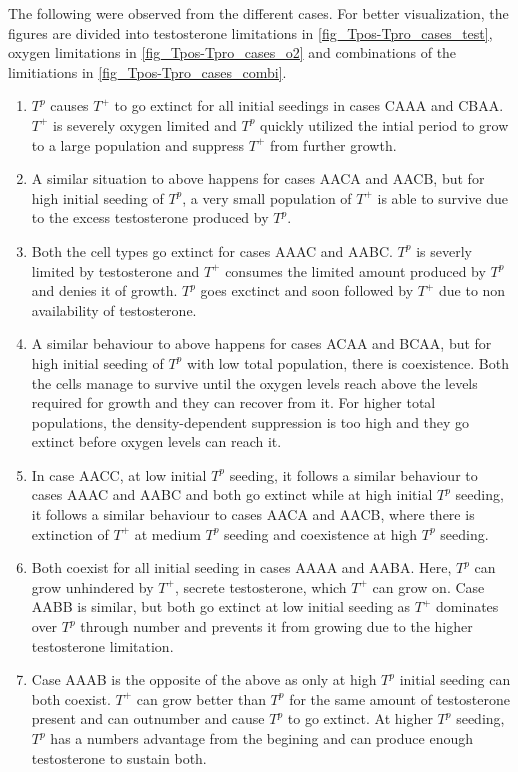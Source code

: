 The following were observed from the different cases. For better visualization, the figures are divided into testosterone limitations in \autoref{fig_Tpos-Tpro_cases_test}, oxygen limitations in \autoref{fig_Tpos-Tpro_cases_o2} and combinations of the limitiations in \autoref{fig_Tpos-Tpro_cases_combi}.
\begin{enumerate}
  \item $T^p$ causes $T^+$ to go extinct for all initial seedings in cases CAAA and CBAA. $T^+$ is severely oxygen limited and $T^p$ quickly utilized the intial period to grow to a large population and suppress $T^+$ from further growth.
  \item A similar situation to above happens for cases AACA and AACB, but for high initial seeding of $T^p$, a very small population of $T^+$ is able to survive due to the excess testosterone produced by $T^p$.
  \item Both the cell types go extinct for cases AAAC and AABC. $T^p$ is severly limited by testosterone and $T^+$ consumes the limited amount produced by $T^p$ and denies it of growth. $T^p$ goes exctinct and soon followed by $T^+$ due to non availability of testosterone.
  \item A similar behaviour to above happens for cases ACAA and BCAA, but for high initial seeding of $T^p$ with low total population, there is coexistence. Both the cells manage to survive until the oxygen levels reach above the levels required for growth and they can recover from it. For higher total populations, the density-dependent suppression is too high and they go extinct before oxygen levels can reach it.
  \item In case AACC, at low initial $T^p$ seeding, it follows a similar behaviour to cases AAAC and AABC and both go extinct while at high initial $T^p$ seeding, it follows a similar behaviour to cases AACA and AACB, where there is extinction of $T^+$ at medium $T^p$ seeding and coexistence at high $T^p$ seeding.
  \item Both coexist for all initial seeding in cases AAAA and AABA. Here, $T^p$ can grow unhindered by $T^+$, secrete testosterone, which $T^+$ can grow on. Case AABB is similar, but both go extinct at low initial seeding as $T^+$ dominates over $T^p$ through number and prevents it from growing due to the higher testosterone limitation.
  \item Case AAAB is the opposite of the above as only at high $T^p$ initial seeding can both coexist. $T^+$ can grow better than $T^p$ for the same amount of testosterone present and can outnumber and cause $T^p$ to go extinct. At higher $T^p$ seeding, $T^p$ has a numbers advantage from the begining and can produce enough testosterone to sustain both.

\end{enumerate}

